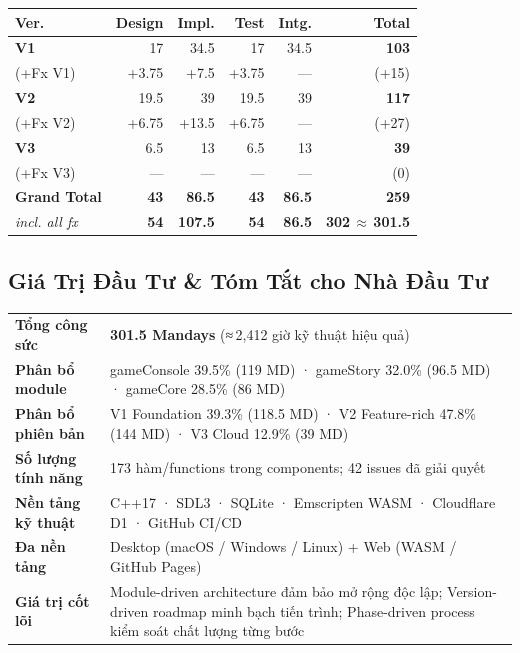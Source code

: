 \documentclass[12pt,a4paper]{article}
\begin{document}
\begin{center}
\renewcommand{\arraystretch}{1.35}
\begin{tabularx}{\linewidth}{|X|r|r|r|r|r|}
\hline
\rowcolor{headerGray!30}
\textbf{Ver.} & \textbf{Design} & \textbf{Impl.} & \textbf{Test} & \textbf{Intg.} & \textbf{Total} \\
\hline
\rowcolor{v1green!10}
\textbf{V1} & 17 & 34.5 & 17 & 34.5 & \textbf{103} \\
(+Fx V1) & +3.75 & +7.5 & +3.75 & — & (+15) \\
\rowcolor{v2amber!10}
\textbf{V2} & 19.5 & 39 & 19.5 & 39 & \textbf{117} \\
(+Fx V2) & +6.75 & +13.5 & +6.75 & — & (+27) \\
\rowcolor{v3red!10}
\textbf{V3} & 6.5 & 13 & 6.5 & 13 & \textbf{39} \\
(+Fx V3) & — & — & — & — & (0) \\
\hline
\rowcolor{headerGray!20}
\textbf{Grand Total} & \textbf{43} & \textbf{86.5} & \textbf{43} & \textbf{86.5} & \textbf{259} \\
\textit{incl. all fx} &
\textbf{54} & \textbf{107.5} & \textbf{54} & \textbf{86.5} & \textbf{302\,$\approx$\,301.5} \\
\hline
\end{tabularx}
\end{center}

\subsection{Giá Trị Đầu Tư \& Tóm Tắt cho Nhà Đầu Tư}

\begin{tabularx}{\linewidth}{|l|X|}
\hline
\rowcolor{headerGray!25}
\multicolumn{2}{|c|}{\textbf{Tổng Hợp Đầu Tư Dự Án cTetris}} \\
\hline
\rowcolor{rowLight}
\textbf{Tổng công sức} & \textbf{301.5 Mandays} (≈\,2{,}412 giờ kỹ thuật hiệu quả) \\
\textbf{Phân bổ module} & gameConsole 39.5\% (119 MD) · gameStory 32.0\% (96.5 MD) · gameCore 28.5\% (86 MD) \\
\rowcolor{rowLight}
\textbf{Phân bổ phiên bản} & V1 Foundation 39.3\% (118.5 MD) · V2 Feature-rich 47.8\% (144 MD) · V3 Cloud 12.9\% (39 MD) \\
\textbf{Số lượng tính năng} & 173 hàm/functions trong components;
42 issues đã giải quyết \\
\rowcolor{rowLight}
\textbf{Nền tảng kỹ thuật} & C++17 · SDL3 · SQLite · Emscripten WASM · Cloudflare D1 · GitHub CI/CD \\
\textbf{Đa nền tảng} & Desktop (macOS / Windows / Linux) + Web (WASM / GitHub Pages) \\
\rowcolor{rowLight}
\textbf{Giá trị cốt lõi} & Module-driven architecture đảm bảo mở rộng độc lập;
Version-driven roadmap minh bạch tiến trình; Phase-driven process kiểm soát chất lượng từng bước \\
\hline
\end{tabularx}

\label{LastPageProjectEffortEstimation}
\end{document}
